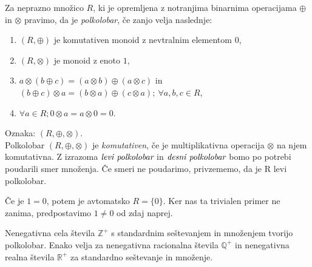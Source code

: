 \documentclass[mat1]{fmfdelo}
\newcommand{\Pplus}[1]{\mathbb{#1}^{+}}
\newcommand{\pojem}[1]{\emph{#1}}
\begin{document}
\begin{definicija}
	Za neprazno množico $R$, ki je opremljena z notranjima binarnima operacijama $\oplus$ in $\otimes$ pravimo, da je \pojem{polkolobar}, če zanjo velja naslednje:
	\begin{enumerate}
		\item $(R, \oplus)$ je komutativen monoid z nevtralnim elementom $0$,
		\item $(R, \otimes)$ je monoid z enoto $1$,
		\item $a\otimes(b \oplus c) = (a\otimes b) \oplus (a\otimes c)$ in $(b \oplus c)\otimes a = (b\otimes a) \oplus (c\otimes a);~\forall a, b, c\in R$,
		\item $\forall a\in R; 0 \otimes a = a\otimes 0 = 0$.
	\end{enumerate}
	Oznaka: $(R, \oplus, \otimes)$. \\ Polkolobar $(R, \oplus, \otimes)$ je \textit{komutativen}, če je multiplikativna operacija $\otimes$ na njem komutativna. Z izrazoma$~\pojem{levi polkolobar}$ in$~\pojem{desni polkolobar}$ bomo po potrebi poudarili smer množenja. Če smeri ne poudarimo, privzememo, da je R levi polkolobar.
\end{definicija}

\begin{opomba}
	Če je $1 = 0$, potem je avtomatsko $R = \{0\}$. Ker nas ta trivialen primer ne zanima, predpostavimo $1 \neq 0$ od zdaj naprej.
\end{opomba}

\begin{zgled}
	Nenegativna cela števila $\Pplus{Z}$ s standardnim seštevanjem in množenjem tvorijo polkolobar. Enako velja za nenegativna racionalna števila $\Pplus{Q}$ in nenegativna realna števila $\Pplus{R}$ za standardno seštevanje in množenje.
\end{zgled}
\end{document}
